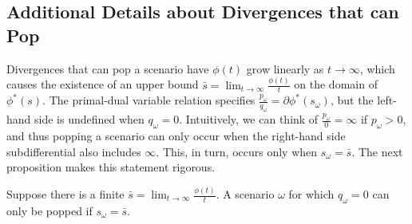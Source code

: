 \documentclass[opre,nonblindrev]{informs3} %
\begin{document}
\subsection{Additional Details about Divergences that can Pop}
\label{ssec:pop}

Divergences that can pop a scenario have $\phi(t)$ grow linearly as $t \rightarrow \infty$, which causes the existence of an upper bound $\bar{s} = \lim_{t \rightarrow \infty} \frac{\phi(t)}{t}$ on the domain of $\phi^*(s)$.
The primal-dual variable relation specifies $\frac{p_\omega}{q_\omega} = \partial \phi^*(s_\omega)$, but the left-hand side is undefined when $q_\omega = 0$.
Intuitively, we can think of $\frac{p_\omega}{0} = \infty$ if $p_\omega > 0$, and thus popping a scenario can only occur when the right-hand side subdifferential also includes $\infty$.
This, in turn, occurs only when $s_\omega = \bar{s}$.
The next proposition makes this statement rigorous.

\begin{proposition} \label{prop:pop}
	Suppose there is a finite $\bar{s} = \lim_{t \rightarrow \infty} \frac{\phi(t)}{t}$.
	A scenario $\omega$ for which $q_\omega = 0$ can only be popped if $s_\omega = \bar{s}$.
\end{proposition}
\end{document}
